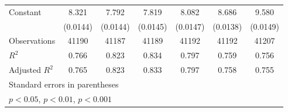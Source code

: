 {\begin{tabular}{l*{6}{c}}
\addlinespace
Constant            &       8.321\sym{***}&       7.792\sym{***}&       7.819\sym{***}&       8.082\sym{***}&       8.686\sym{***}&       9.580\sym{***}\\
                    &    (0.0144)         &    (0.0144)         &    (0.0145)         &    (0.0147)         &    (0.0138)         &    (0.0149)         \\
\midrule
Observations        &       41190         &       41187         &       41189         &       41192         &       41192         &       41207         \\
\(R^{2}\)           &       0.766         &       0.823         &       0.834         &       0.797         &       0.759         &       0.756         \\
Adjusted \(R^{2}\)  &       0.765         &       0.823         &       0.833         &       0.797         &       0.758         &       0.755         \\
\bottomrule
\multicolumn{7}{l}{\footnotesize Standard errors in parentheses}\\
\multicolumn{7}{l}{\footnotesize \sym{*} \(p<0.05\), \sym{**} \(p<0.01\), \sym{***} \(p<0.001\)}\\
\end{tabular}
}

